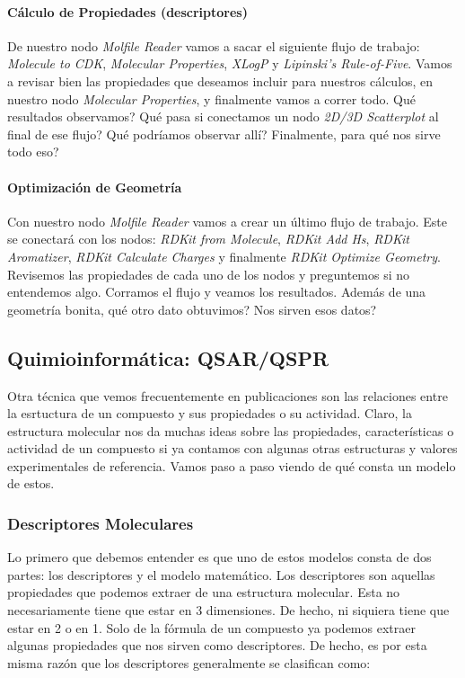 \documentclass[10pt,letterpaper]{article}
\begin{document}
\paragraph{C\'alculo de Propiedades (descriptores)}
De nuestro nodo \emph{Molfile Reader} vamos a sacar el siguiente flujo de trabajo: \emph{Molecule to CDK}, \emph{Molecular Properties}, \emph{XLogP} y \emph{Lipinski's Rule-of-Five}. Vamos a revisar bien las propiedades que deseamos incluir para nuestros c\'alculos, en nuestro nodo \emph{Molecular Properties}, y finalmente vamos a correr todo. Qu\'e resultados observamos? Qu\'e pasa si conectamos un nodo \emph{2D/3D Scatterplot} al final de ese flujo? Qu\'e podr\'iamos observar all\'i? Finalmente, para qu\'e nos sirve todo eso?

\paragraph{Optimizaci\'on de Geometr\'ia}
Con nuestro nodo \emph{Molfile Reader} vamos a crear un \'ultimo flujo de trabajo. Este se conectar\'a con los nodos: \emph{RDKit from Molecule}, \emph{RDKit Add Hs}, \emph{RDKit Aromatizer}, \emph{RDKit Calculate Charges} y finalmente \emph{RDKit Optimize Geometry}. Revisemos las propiedades de cada uno de los nodos y preguntemos si no entendemos algo. Corramos el flujo y veamos los resultados. Adem\'as de una geometr\'ia bonita, qu\'e otro dato obtuvimos? Nos sirven esos datos?

\subsection{Quimioinform\'atica: QSAR/QSPR}
Otra t\'ecnica que vemos frecuentemente en publicaciones son las relaciones entre la esrtuctura de un compuesto y sus propiedades o su actividad. Claro, la estructura molecular nos da muchas ideas sobre las propiedades, caracter\'isticas o actividad de un compuesto si ya contamos con algunas otras estructuras y valores experimentales de referencia. Vamos paso a paso viendo de qu\'e consta un modelo de estos.\\

\subsubsection{Descriptores Moleculares}
Lo primero que debemos entender es que uno de estos modelos consta de dos partes: los descriptores y el modelo matem\'atico. Los descriptores son aquellas propiedades que podemos extraer de una estructura molecular. Esta no necesariamente tiene que estar en 3 dimensiones. De hecho, ni siquiera tiene que estar en 2 o en 1. Solo de la f\'ormula de un compuesto ya podemos extraer algunas propiedades que nos sirven como descriptores. De hecho, es por esta misma raz\'on que los descriptores generalmente se clasifican como:
\end{document}
